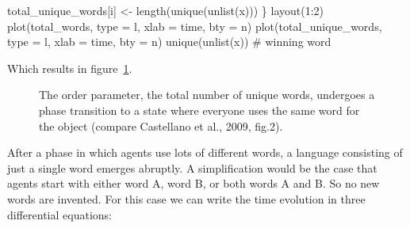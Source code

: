 \documentclass[
  a4paper,
  DIV=11,
  numbers=noendperiod,
  oneside]{scrreprt}
\newenvironment{Shaded}{}{}
\newcommand{\AttributeTok}[1]{\textcolor[rgb]{0.84,0.23,0.29}{#1}}
\newcommand{\CommentTok}[1]{\textcolor[rgb]{0.42,0.45,0.49}{#1}}
\newcommand{\DecValTok}[1]{\textcolor[rgb]{0.00,0.36,0.77}{#1}}
\newcommand{\FunctionTok}[1]{\textcolor[rgb]{0.44,0.26,0.76}{#1}}
\newcommand{\NormalTok}[1]{\textcolor[rgb]{0.14,0.16,0.18}{#1}}
\newcommand{\OtherTok}[1]{\textcolor[rgb]{0.44,0.26,0.76}{#1}}
\newcommand{\SpecialCharTok}[1]{\textcolor[rgb]{0.00,0.36,0.77}{#1}}
\newcommand{\StringTok}[1]{\textcolor[rgb]{0.01,0.18,0.38}{#1}}
\begin{document}
\begin{Shaded}
\begin{Highlighting}[]
\NormalTok{  total\_unique\_words[i] }\OtherTok{\textless{}{-}} \FunctionTok{length}\NormalTok{(}\FunctionTok{unique}\NormalTok{(}\FunctionTok{unlist}\NormalTok{(x)))}
\NormalTok{\}}
\FunctionTok{layout}\NormalTok{(}\DecValTok{1}\SpecialCharTok{:}\DecValTok{2}\NormalTok{)}
\FunctionTok{plot}\NormalTok{(total\_words, }\AttributeTok{type =} \StringTok{\textquotesingle{}l\textquotesingle{}}\NormalTok{, }\AttributeTok{xlab =} \StringTok{\textquotesingle{}time\textquotesingle{}}\NormalTok{, }\AttributeTok{bty =} \StringTok{\textquotesingle{}n\textquotesingle{}}\NormalTok{)}
\FunctionTok{plot}\NormalTok{(total\_unique\_words, }\AttributeTok{type =} \StringTok{\textquotesingle{}l\textquotesingle{}}\NormalTok{, }\AttributeTok{xlab =} \StringTok{\textquotesingle{}time\textquotesingle{}}\NormalTok{, }\AttributeTok{bty =} \StringTok{\textquotesingle{}n\textquotesingle{}}\NormalTok{)}
\FunctionTok{unique}\NormalTok{(}\FunctionTok{unlist}\NormalTok{(x)) }\CommentTok{\# winning word}
\end{Highlighting}
\end{Shaded}

Which results in figure~\ref{fig-ch7-img3-old-91}.

\begin{figure}


\caption{\label{fig-ch7-img3-old-91}The order parameter, the total
number of unique words, undergoes a phase transition to a state where
everyone uses the same word for the object (compare Castellano et al.,
2009, fig.2).}

\end{figure}%

After a phase in which agents use lots of different words, a language
consisting of just a single word emerges abruptly. A simplification
would be the case that agents start with either word A, word B, or both
words A and B. So no new words are invented. For this case we can write
the time evolution in three differential equations:
\end{document}
